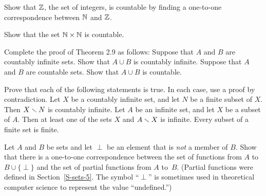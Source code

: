 \begin{exercises}
\problem Show that ${\mathbb Z}$, the set of integers, is countable by finding
a one-to-one correspondence between ${\mathbb N}$ and ${\mathbb Z}$.

\problem Show that the set ${\mathbb N}\times{\mathbb N}$ is countable.

\problem Complete the proof of Theorem 2.9 as follows:
\ppart Suppose that $A$ and $B$ are countably infinite sets.
Show that $A\cup B$ is countably infinite.
\ppart Suppose that $A$ and $B$ are countable sets.
Show that $A\cup B$ is countable.

\problem Prove that each of the following statements is true.
In each case, use a proof by contradiction.
\ppart Let $X$ be a countably infinite set, and let $N$ be a finite
subset of $X$.  Then $X\smallsetminus N$ is countably infinite.
\ppart Let $A$ be an infinite set, and let $X$ be a subset of $A$.
Then at least one of the sets $X$ and $A\smallsetminus X$ is infinite.
\ppart Every subset of a finite set is finite.

\problem Let $A$ and $B$ be sets and let $\perp$ be an element that is \emph{not}
a member of $B$.  Show that there is a one-to-one correspondence between
the set of functions from $A$ to $B\cup\{\perp\}$ and the set of
partial functions from $A$ to~$B$.  (Partial functions were defined
in Section~\ref{S-sets-5}.  The symbol ``$\perp$'' is sometimes used in
theoretical computer science to represent the value ``undefined.'')

\end{exercises}


